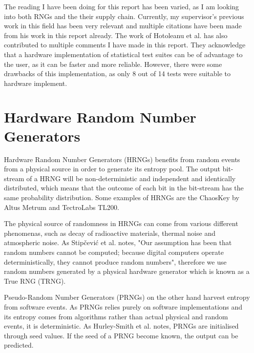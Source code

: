 \documentclass[]{final_report}
\begin{document}
\par{The reading I have been doing for this report has been varied, as I am looking into both RNGs and the their supply chain. Currently, my supervisor's previous work in this field has been very relevant and multiple citations have been made from his work in this report already. The work of Hotoleanu et al. has also contributed to multiple comments I have made in this report. They acknowledge that a hardware implementation of statistical test suites can be of advantage to the user, as it can be faster and more reliable. However, there were some drawbacks of this implementation, as only 8 out of 14 tests were suitable to hardware implement.\cite{Hotoleanu:2010}}

\newpage
\section*{Hardware Random Number Generators}

\par{Hardware Random Number Generators (HRNGs) benefits from random events from a physical source in order to generate its entropy pool. The output bit-stream of a HRNG will be non-deterministic and independent and identically distributed, which means that the outcome of each bit in the bit-stream has the same probability distribution. Some examples of HRNGs are the ChaosKey by Altus Metrum and TectroLabs TL200.}

\par{The physical source of randomness in HRNGs can come from various different phenomenas, such as decay of radioactive materials\cite{Rohe:2003}, thermal noise\cite{Rohe:2003} and atmospheric noise\cite{Jun:1999}. As Stipčević et al.\cite{Stipcevic:2014} notes, "Our assumption has been that random numbers cannot be computed; because digital computers operate deterministically, they cannot produce random numbers", therefore we use random numbers generated by a physical hardware generator which is known as a True RNG (TRNG).}

\par{Pseudo-Random Number Generators (PRNGs) on the other hand harvest entropy from software events. As PRNGs relies purely on software implementations and its entropy comes from algorithms rather than actual physical and random events, it is deterministic. As Hurley-Smith et al.\cite{Smith:2018} notes, PRNGs are initialised through seed values. If the seed of a PRNG become known, the output can be predicted.}
\end{document}
